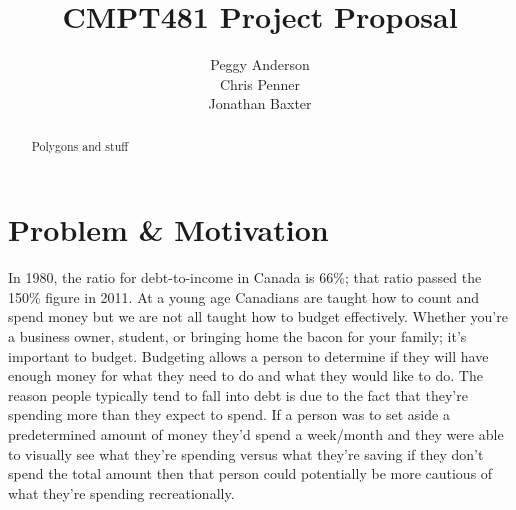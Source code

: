 \documentclass{chi2011}
\begin{document}
\setlength{\paperheight}{11in}
\setlength{\paperwidth}{8.5in}
\setlength{\pdfpageheight}{\paperheight}
\setlength{\pdfpagewidth}{\paperwidth}


\title{CMPT481 Project Proposal}
\author{
\alignauthor Peggy Anderson\\
    \alignauthor Chris Penner\\
    \alignauthor Jonathan Baxter\\
}


\maketitle

\begin{abstract}
    Polygons and stuff
\end{abstract}

\section{Problem \& Motivation}

In 1980, the ratio for debt-to-income in Canada is 66\%; that ratio passed the 150\% figure in 2011. At a young age 
Canadians are taught how to count and spend money but we are not all taught how to budget effectively. Whether you're 
a business owner, student, or bringing home the bacon for your family; it's important to budget. Budgeting allows a 
person to determine if they will have enough money for what they need to do and what they would like to do. The reason
people typically tend to fall into debt is due to the fact that they're spending more than they expect to spend. If a 
person was to set aside a predetermined amount of money they'd spend a week/month and they were able to visually see what 
they're spending versus what they're saving if they don't spend the total amount then that person could potentially 
be more cautious of what they're spending recreationally.
\end{document}
